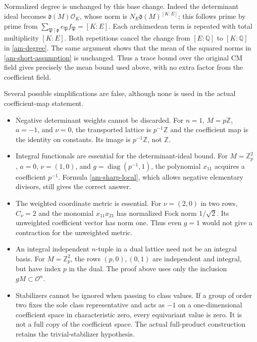 Normalized degree is unchanged by this base change. Indeed the
determinant ideal becomes $\mathfrak d(M)\mathcal O_K$, whose norm is
$N_E\mathfrak d(M)^{[K:E]}$; this follows prime by prime from
$\sum_{\mathfrak P\mid\mathfrak p}e_{\mathfrak P}f_{\mathfrak P}=[K:E]$.
Each archimedean term is repeated with total multiplicity $[K:E]$.
Both repetitions cancel the change from $[E:\mathbb Q]$ to
$[K:\mathbb Q]$ in \eqref{am-degree}. The same argument shows that
the mean of the squared norms in \eqref{am-short-assumption} is unchanged.
Thus a trace bound over the original CM field gives precisely the mean
bound used above, with no extra factor from the coefficient field.

Several possible simplifications are false, although none is used in
the actual coefficient-map statement.

\begin{itemize}
\item Negative determinant weights cannot be discarded. For $n=1$,
 $M=p\mathbb Z$, $a=-1$, and $\nu=0$, the transported lattice is
 $p^{-1}\mathbb Z$ and the coefficient map is the identity on constants.
 Its image is $p^{-1}\mathbb Z$, not $\mathbb Z$.
\item Integral functionals are essential for the determinant-ideal
 bound. For $M=\mathbb Z_p^2$, $a=0$, $\nu=(1,0)$, and
 $g=\operatorname{diag}(p^{-1},1)$, the polynomial $x_{11}$ acquires
 a coefficient $p^{-1}$. Formula \eqref{am-sharp-local}, which allows
 negative elementary divisors, still gives the correct answer.
\item The weighted coordinate metric is essential. For $\nu=(2,0)$
 in two rows, $C_\nu=2$ and the monomial $x_{11}x_{21}$ has normalized
 Fock norm $1/\sqrt2$. Its unweighted coefficient vector has norm one.
 Thus even $g=1$ would not give a contraction for the unweighted metric.
\item An integral independent $n$-tuple in a dual lattice need not be
 an integral basis. For $M=\mathbb Z_p^2$, the rows $(p,0),(0,1)$
 are independent and integral, but have index $p$ in the dual.
 The proof above uses only the inclusion $gM\subset\mathcal O^n$.
\item Stabilizers cannot be ignored when passing to class values. If
 a group of order two fixes the sole class representative and acts as
 $-1$ on a one-dimensional coefficient space in characteristic zero,
 every equivariant value is zero. It is not a full copy of the
 coefficient space. The actual full-product construction retains the
 trivial-stabilizer hypothesis.
\end{itemize}

